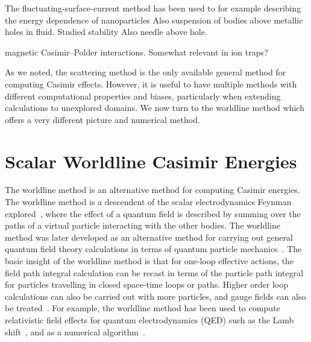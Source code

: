 The fluctuating-surface-current method has been used to 
for example describing the energy dependence of nanoparticles%
\cite{Levin2010,Rodriguez2013} Also suspension of bodies above metallic holes in fluid.  Studied stability
Also needle above hole.  

\cite{Haakh2009} magnetic Casimir--Polder interactions.  Somewhat relevant in ion traps?

As we noted, the scattering method is the only available general method for computing Casimir effects.
However, it is useful to have multiple methods with different computational properties
and biases, particularly when extending calculations to unexplored domains.  We now turn to the worldline
method which offers a very different picture and numerical method.  



\section{Scalar Worldline Casimir Energies}

The worldline method is an alternative method for computing Casimir energies.
The worldline method is a descendent of the scalar electrodynamics 
Feynman explored~\cite{Feynman1950}, where the effect of a quantum
field is described by summing over the paths of a virtual particle interacting with the other bodies. 
The worldline method was later developed as an alternative method for 
carrying out general quantum field theory calculations in terms of quantum particle 
mechanics~\cite{McKeon1993, Strassler1992,Schubert2001}.  
The basic insight of the worldline method is that for one-loop effective actions, 
the field path integral calculation can be recast in terms of the particle path
 integral for particles travelling in closed space-time loops or paths.
  Higher order loop calculations can also be carried out with more particles, 
and gauge fields can also be treated~\cite{Schubert2001}.
  For example, the worldline method has been used to compute relativistic
 field effects for quantum electrodynamics (QED) such as the Lamb shift~\cite{Schmidt1995},
 and as a numerical algorithm~\cite{Mazur2014}.

